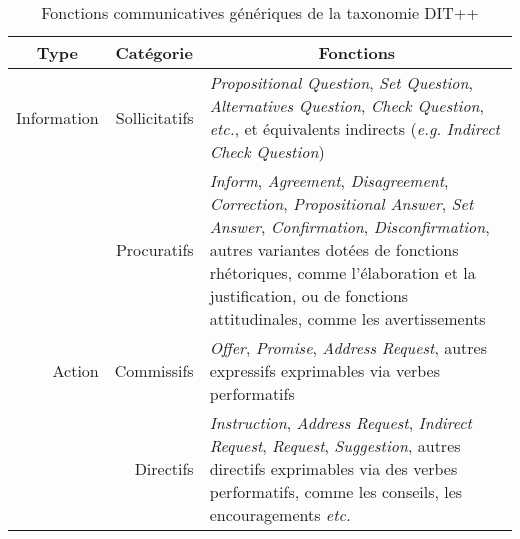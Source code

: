 \documentclass[10pt,a4paper,twoside]{article}
\begin{document}
\begin{table}[h]
	\centering
	\begin{tabularx}{\textwidth}{rrX}
		\toprule
		\multicolumn{1}{c}{Type} & \multicolumn{1}{c}{Catégorie} & \multicolumn{1}{c}{Fonctions} \\
		\midrule
		Information & Sollicitatifs & \textit{Propositional Question}, \textit{Set Question}, \textit{Alternatives Question}, \textit{Check Question}, \textit{etc.}, et équivalents indirects (\textit{e.g.} \textit{Indirect Check Question}) \\
		\cmidrule(r){2-3}
		& Procuratifs & \textit{Inform}, \textit{Agreement}, \textit{Disagreement}, \textit{Correction}, \textit{Propositional Answer}, \textit{Set Answer}, \textit{Confirmation}, \textit{Disconfirmation}, autres variantes dotées de fonctions rhétoriques, comme l’élaboration et la justification, ou de fonctions attitudinales, comme les avertissements \\
		\cmidrule(r){1-3}
		Action & Commissifs & \textit{Offer}, \textit{Promise}, \textit{Address Request}, autres expressifs exprimables via verbes performatifs \\
		\cmidrule(r){2-3}
		& Directifs & \textit{Instruction}, \textit{Address Request}, \textit{Indirect} \textit{Request}, \textit{Request}, \textit{Suggestion}, autres directifs exprimables via des verbes performatifs, comme les conseils, les encouragements \textit{etc.} \\
		\bottomrule
	\end{tabularx}
	\caption{Fonctions communicatives génériques de la taxonomie DIT++}
	\label{fig:DITClasses}
\end{table}


\end{document}

